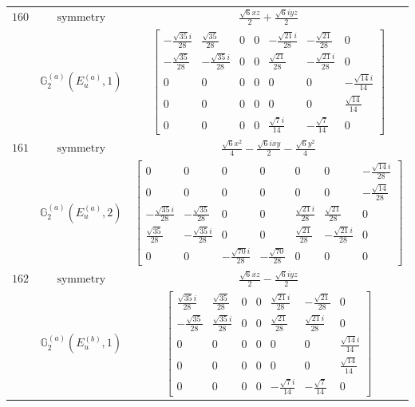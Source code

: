 \documentclass[fleqn,8pt,landscape]{jsarticle}
\begin{document}
\begin{longtable}{ccc}
$ 160 $ & $ \text{symmetry} $ & $ \frac{\sqrt{6} x z}{2} + \frac{\sqrt{6} i y z}{2} $ \\
$  $ & $ \mathbb{G}_{2}^{(a)}(E_{u}^{(a)},1) $ & $ \begin{bmatrix} - \frac{\sqrt{35} i}{28} & \frac{\sqrt{35}}{28} & 0 & 0 & - \frac{\sqrt{21} i}{28} & - \frac{\sqrt{21}}{28} & 0 \\ - \frac{\sqrt{35}}{28} & - \frac{\sqrt{35} i}{28} & 0 & 0 & \frac{\sqrt{21}}{28} & - \frac{\sqrt{21} i}{28} & 0 \\ 0 & 0 & 0 & 0 & 0 & 0 & - \frac{\sqrt{14} i}{14} \\ 0 & 0 & 0 & 0 & 0 & 0 & \frac{\sqrt{14}}{14} \\ 0 & 0 & 0 & 0 & \frac{\sqrt{7} i}{14} & - \frac{\sqrt{7}}{14} & 0 \end{bmatrix} $ \\ \hline
$ 161 $ & $ \text{symmetry} $ & $ \frac{\sqrt{6} x^{2}}{4} - \frac{\sqrt{6} i x y}{2} - \frac{\sqrt{6} y^{2}}{4} $ \\
$  $ & $ \mathbb{G}_{2}^{(a)}(E_{u}^{(a)},2) $ & $ \begin{bmatrix} 0 & 0 & 0 & 0 & 0 & 0 & - \frac{\sqrt{14} i}{28} \\ 0 & 0 & 0 & 0 & 0 & 0 & - \frac{\sqrt{14}}{28} \\ - \frac{\sqrt{35} i}{28} & - \frac{\sqrt{35}}{28} & 0 & 0 & \frac{\sqrt{21} i}{28} & \frac{\sqrt{21}}{28} & 0 \\ \frac{\sqrt{35}}{28} & - \frac{\sqrt{35} i}{28} & 0 & 0 & \frac{\sqrt{21}}{28} & - \frac{\sqrt{21} i}{28} & 0 \\ 0 & 0 & - \frac{\sqrt{70} i}{28} & - \frac{\sqrt{70}}{28} & 0 & 0 & 0 \end{bmatrix} $ \\ \hline
$ 162 $ & $ \text{symmetry} $ & $ \frac{\sqrt{6} x z}{2} - \frac{\sqrt{6} i y z}{2} $ \\
$  $ & $ \mathbb{G}_{2}^{(a)}(E_{u}^{(b)},1) $ & $ \begin{bmatrix} \frac{\sqrt{35} i}{28} & \frac{\sqrt{35}}{28} & 0 & 0 & \frac{\sqrt{21} i}{28} & - \frac{\sqrt{21}}{28} & 0 \\ - \frac{\sqrt{35}}{28} & \frac{\sqrt{35} i}{28} & 0 & 0 & \frac{\sqrt{21}}{28} & \frac{\sqrt{21} i}{28} & 0 \\ 0 & 0 & 0 & 0 & 0 & 0 & \frac{\sqrt{14} i}{14} \\ 0 & 0 & 0 & 0 & 0 & 0 & \frac{\sqrt{14}}{14} \\ 0 & 0 & 0 & 0 & - \frac{\sqrt{7} i}{14} & - \frac{\sqrt{7}}{14} & 0 \end{bmatrix} $ \\ \hline

\end{longtable}
\end{document}
